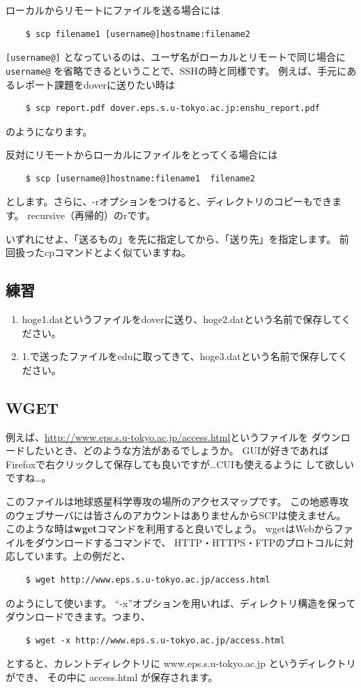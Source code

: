 \documentclass[a4j]{ltjsreport}
\begin{document}
    ローカルからリモートにファイルを送る場合には
    \begin{verbatim}
    $ scp filename1 [username@]hostname:filename2
    \end{verbatim}
    \verb|[username@]| となっているのは、ユーザ名がローカルとリモートで同じ場合に
    \verb|username@| を省略できるということで、SSHの時と同様です。
    例えば、手元にあるレポート課題をdoverに送りたい時は
    \begin{verbatim}
    $ scp report.pdf dover.eps.s.u-tokyo.ac.jp:enshu_report.pdf
    \end{verbatim}
    のようになります。

    反対にリモートからローカルにファイルをとってくる場合には
    \begin{verbatim}
    $ scp [username@]hostname:filename1  filename2
    \end{verbatim}
    とします。さらに、-rオプションをつけると、ディレクトリのコピーもできます。
    recursive（再帰的）のrです。 

    いずれにせよ、「送るもの」を先に指定してから、「送り先」を指定します。
    前回扱ったcpコマンドとよく似ていますね。

    \vspace{1em}

    \subsection{練習}
    \begin{enumerate}
        \item hoge1.datというファイルをdoverに送り、hoge2.datという名前で保存してください。
        \item 1.で送ったファイルをeduに取ってきて、hoge3.datという名前で保存してください。
    \end{enumerate}

    \subsection{WGET}
    例えば、\url{http://www.eps.s.u-tokyo.ac.jp/access.html}というファイルを
    ダウンロードしたいとき、どのような方法があるでしょうか。
    GUIが好きであればFirefoxで右クリックして保存しても良いですが…CUIも使えるように
    して欲しいですね…。

    このファイルは地球惑星科学専攻の場所のアクセスマップです。
    この地惑専攻のウェブサーバには皆さんのアカウントはありませんからSCPは使えません。
    このような時は\textbf{wget}コマンドを利用すると良いでしょう。
    wgetはWebからファイルをダウンロードするコマンドで、
    HTTP・HTTPS・FTPのプロトコルに対応しています。上の例だと、
    \begin{verbatim}
    $ wget http://www.eps.s.u-tokyo.ac.jp/access.html
    \end{verbatim}
    のようにして使います。
    “-x”オプションを用いれば、ディレクトリ構造を保ってダウンロードできます。つまり、
    \begin{verbatim}
    $ wget -x http://www.eps.s.u-tokyo.ac.jp/access.html
    \end{verbatim}
    とすると、カレントディレクトリに www.eps.s.u-tokyo.ac.jp というディレクトリができ、
    その中に access.html が保存されます。
\end{document}
